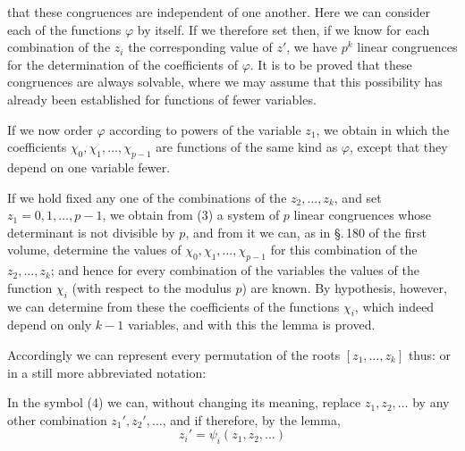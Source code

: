 that these congruences are independent of one another. Here we can consider each of the functions $\varphi$ by itself. If we therefore set
then, if we know for each combination of the $z_i$ the corresponding value of $z'$, we have $p^k$ linear congruences for the determination of the coefficients of $\varphi$. It is to be proved that these congruences are always solvable, where we may assume that this possibility has already been established for functions of fewer variables.

If we now order $\varphi$ according to powers of the variable $z_1$, we obtain
in which the coefficients $\chi_0, \chi_1, \ldots, \chi_{p-1}$ are functions of the same kind as $\varphi$, except that they depend on one variable fewer.

If we hold fixed any one of the combinations of the $z_2, \ldots, z_k$, and set $z_1 = 0, 1, \ldots, p - 1$, we obtain from (3) a system of $p$ linear congruences whose determinant is not divisible by $p$, and from it we can, as in \S.\,180 of the first volume, determine the values of $\chi_0, \chi_1, \ldots, \chi_{p-1}$ for this combination of the $z_2, \ldots, z_k$; and hence for every combination of the variables the values of the function $\chi_i$ (with respect to the modulus $p$) are known. By hypothesis, however, we can determine from these the coefficients of the functions $\chi_i$, which indeed depend on only $k - 1$ variables, and with this the lemma is proved.

Accordingly we can represent every permutation of the roots $[z_1, \ldots, z_k]$ thus:
or in a still more abbreviated notation:

In the symbol (4) we can, without changing its meaning, replace $z_1, z_2, \ldots$ by any other combination $z_1', z_2', \ldots$, and if therefore, by the lemma,
\[
z_i' = \psi_i(z_1, z_2, \ldots)
\]
